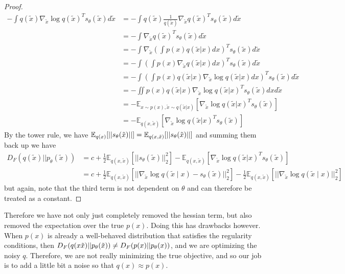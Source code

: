 \begin{proof}
      \begin{align}
        -\int q(\tilde{x})\nabla_{\tilde{x}} \log q(\tilde{x})^T s_\theta(\tilde{x}) d\tilde{x} & = -\int q(\tilde{x})\frac{1}{q(\tilde{x})}\nabla_{\tilde{x}}q(\tilde{x})^T s_\theta(\tilde{x}) d\tilde{x} \\
                                                                                                & = -\int \nabla_{\tilde{x}}q(\tilde{x})^T s_\theta(\tilde{x}) d\tilde{x} \\
        & = -\int \nabla_{\tilde{x}}\left(\int p(x)q(\tilde{x}|x) dx\right)^T s_\theta(\tilde{x}) d\tilde{x} \\
        & = -\int \left(\int p(x)\nabla_{\tilde{x}}q(\tilde{x}|x) dx\right)^T s_\theta(\tilde{x}) d\tilde{x} \\
        & = -\int \left(\int p(x)q(\tilde{x}|x)\nabla_{\tilde{x}} \log q(\tilde{x}|x) dx\right)^T s_\theta(\tilde{x}) d\tilde{x} \\
        & = -\iint p(x)q(\tilde{x}|x)\nabla_{\tilde{x}} \log q(\tilde{x}|x)^T s_\theta(\tilde{x}) dx d\tilde{x} \\
        & = -\mathbb{E}_{x\sim p(x),\tilde{x}\sim q(\tilde{x}|x)}\left[\nabla_{\tilde{x}} \log q(\tilde{x}|x)^T s_\theta(\tilde{x})\right] \\
        & = -\mathbb{E}_{q(x, \tilde{x})}\left[\nabla_{\tilde{x}} \log q(\tilde{x}|x)^T s_\theta(\tilde{x})\right] 
      \end{align} 
      By the tower rule, we have $\mathbb{E}_{q(x)} [ ||s_\theta (\Tilde{x})||] = \mathbb{E}_{q(x, \tilde{x})} [ ||s_\theta (\Tilde{x})||]$ and summing them back up we have 
      \begin{align}
        D_F (q(\tilde{x}) || p_\theta (\tilde{x})) & = c + \frac{1}{2} \mathbb{E}_{q(x, \tilde{x})} [||s_\theta (\tilde{x})||_2^2] - \mathbb{E}_{q(x, \tilde{x})}\left[\nabla_{\tilde{x}} \log q(\tilde{x}|x)^T s_\theta(\tilde{x})\right] \\
                                                   & = c + \frac{1}{2} \mathbb{E}_{q(x, \tilde{x})} [ || \nabla_{\tilde{x}} \log q(\tilde{x} \mid x) - s_\theta (\tilde{x})||_2^2 ] - \frac{1}{2} \mathbb{E}_{q(x, \tilde{x})} [ || \nabla_{\tilde{x}} \log q(\tilde{x} \mid x) ||_2^2 ]
      \end{align}
      but again, note that the third term is not dependent on $\theta$ and can therefore be treated as a constant. 
    \end{proof}

    Therefore we have not only just completely removed the hessian term, but also removed the expectation over the true $p(x)$. Doing this has drawbacks however. When $p(x)$ is already a well-behaved distribution that satisfies the regularity conditions, then $D_F (q(x\Tilde{x}) || p_\theta (\Tilde{x})) \neq D_F(p(x) || p_\theta (x))$, and we are optimizing the noisy $q$. Therefore, we are not really minimizing the true objective, and so our job is to add a little bit a noise so that $q(x) \approx p(x)$. 

